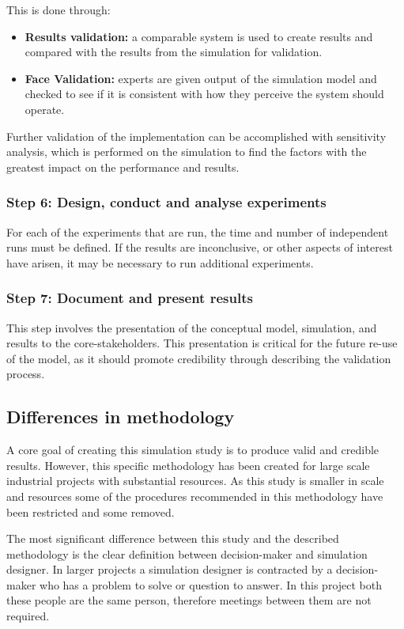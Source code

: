 This is done through:
\begin{itemize}
  \item \textbf{Results validation: } a comparable system is used to create results and compared with the results from the simulation for validation.
  \item \textbf{Face Validation: } experts are given output of the simulation model and checked to see if it is consistent with how they perceive the system should operate.
\end{itemize}

Further validation of the implementation can be accomplished with sensitivity analysis,
which is performed on the simulation to find the factors with the greatest impact on the performance and results.

\subsubsection{Step 6: Design, conduct and analyse experiments}
For each of the experiments that are run, the time and number of independent runs must be defined.
If the results are inconclusive, or other aspects of interest have arisen, it may be necessary to run additional experiments.

\subsubsection{Step 7: Document and present results}
This step involves the presentation of the conceptual model, simulation, and results to the core-stakeholders.
This presentation is critical for the future re-use of the model, as it should promote credibility through describing the validation process.

\subsection{Differences in methodology}
A core goal of creating this simulation study is to produce valid and credible results.
However, this specific methodology has been created for large scale industrial projects with substantial resources.
As this study is smaller in scale and resources some of the procedures recommended in this methodology have been restricted and some removed.

The most significant difference between this study and the described methodology is the clear definition between decision-maker and simulation designer.
In larger projects a simulation designer is contracted by a decision-maker who has a problem to solve or question to answer.
In this project both these people are the same person, therefore meetings between them are not required.

